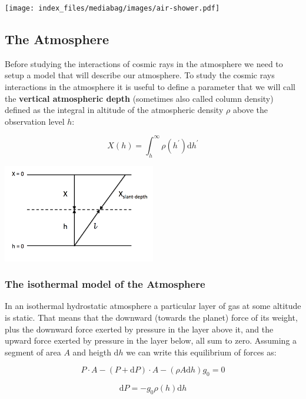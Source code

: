 \documentclass[
  letterpaper,
  DIV=11,
  numbers=noendperiod]{scrreprt}
\begin{document}
\begin{center}
\texttt{[image: index\_files/mediabag/images/air-shower.pdf]}
\end{center}

\subsection{The Atmosphere}\label{the-atmosphere}

Before studying the interactions of cosmic rays in the atmosphere we
need to setup a model that will describe our atmosphere. To study the
cosmic rays interactions in the atmosphere it is useful to define a
parameter that we will call the \textbf{vertical atmospheric depth}
(sometimes also called column density) defined as the integral in
altitude of the atmospheric density \(\rho\) above the observation level
\(h\):

\[X(h) =\int_h^{\infty} \rho(h^\prime)\mathrm{ d}h^\prime\]

\begin{center}
\includegraphics[width=0.5\textwidth,height=\textheight]{images/atmos.png}
\end{center}

\subsubsection{The isothermal model of the
Atmosphere}\label{the-isothermal-model-of-the-atmosphere}

In an isothermal hydrostatic atmosphere a particular layer of gas at
some altitude is static. That means that the downward (towards the
planet) force of its weight, plus the downward force exerted by pressure
in the layer above it, and the upward force exerted by pressure in the
layer below, all sum to zero. Assuming a segment of area \(A\) and
heigth \(\mathrm{ d}h\) we can write this equilibrium of forces as:

\[P\cdot A - (P + \mathrm{ d}P)\cdot A - (\rho A \mathrm{ d}h)g_0  =0\]

\[\mathrm{ d}P = -g_0\rho(h) \mathrm{ d}h\]
\end{document}
